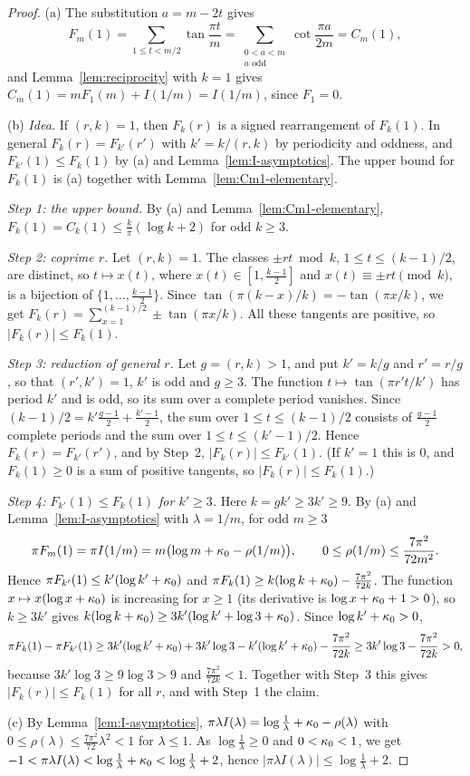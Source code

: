 \begin{proof}
(a) The substitution $a=m-2t$ gives
\[
F_m(1)=\sum_{1\le t<m/2}\tan\frac{\pi t}m=\sum_{\substack{0<a<m\\ a\text{ odd}}}\cot\frac{\pi a}{2m}=C_m(1),
\]
and Lemma~\ref{lem:reciprocity} with $k=1$ gives $C_m(1)=mF_1(m)+I(1/m)=I(1/m)$, since $F_1=0$.

(b) \emph{Idea.} If $(r,k)=1$, then $F_k(r)$ is a signed rearrangement of $F_k(1)$. In general $F_k(r)=F_{k'}(r')$ with $k'=k/(r,k)$ by periodicity and oddness, and $F_{k'}(1)\le F_k(1)$ by (a) and Lemma~\ref{lem:I-asymptotics}. The upper bound for $F_k(1)$ is (a) together with Lemma~\ref{lem:Cm1-elementary}.

\emph{Step 1: the upper bound.} By (a) and Lemma~\ref{lem:Cm1-elementary}, $F_k(1)=C_k(1)\le\frac k\pi(\log k+2)$ for odd $k\ge3$.

\emph{Step 2: coprime $r$.} Let $(r,k)=1$. The classes $\pm rt\bmod k$, $1\le t\le(k-1)/2$, are distinct, so $t\mapsto x(t)$, where $x(t)\in[1,\frac{k-1}2]$ and $x(t)\equiv\pm rt\pmod k$, is a bijection of $\{1,\dots,\frac{k-1}2\}$. Since $\tan(\pi(k-x)/k)=-\tan(\pi x/k)$, we get $F_k(r)=\sum_{x=1}^{(k-1)/2}\pm\tan(\pi x/k)$. All these tangents are positive, so $|F_k(r)|\le F_k(1)$.

\emph{Step 3: reduction of general $r$.} Let $g=(r,k)>1$, and put $k'=k/g$ and $r'=r/g$, so that $(r',k')=1$, $k'$ is odd and $g\ge3$. The function $t\mapsto\tan(\pi r't/k')$ has period $k'$ and is odd, so its sum over a complete period vanishes. Since $(k-1)/2=k'\frac{g-1}2+\frac{k'-1}2$, the sum over $1\le t\le(k-1)/2$ consists of $\frac{g-1}2$ complete periods and the sum over $1\le t\le(k'-1)/2$. Hence $F_k(r)=F_{k'}(r')$, and by Step~2, $|F_k(r)|\le F_{k'}(1)$. (If $k'=1$ this is $0$, and $F_k(1)\ge0$ is a sum of positive tangents, so $|F_k(r)|\le F_k(1)$.)

\emph{Step 4: $F_{k'}(1)\le F_k(1)$ for $k'\ge3$.} Here $k=gk'\ge3k'\ge9$. By (a) and Lemma~\ref{lem:I-asymptotics} with $\lambda=1/m$, for odd $m\ge3$
\[
\pi F_m(1)=\pi I(1/m)=m\bigl(\log m+\kappa_0-\rho(1/m)\bigr),\qquad 0\le\rho(1/m)\le\frac{7\pi^2}{72m^2}.
\]
Hence $\pi F_{k'}(1)\le k'(\log k'+\kappa_0)$ and $\pi F_k(1)\ge k(\log k+\kappa_0)-\frac{7\pi^2}{72k}$. The function $x\mapsto x(\log x+\kappa_0)$ is increasing for $x\ge1$ (its derivative is $\log x+\kappa_0+1>0$), so $k\ge3k'$ gives $k(\log k+\kappa_0)\ge3k'(\log k'+\log3+\kappa_0)$. Since $\log k'+\kappa_0>0$,
\[
\pi F_k(1)-\pi F_{k'}(1)\ge3k'(\log k'+\kappa_0)+3k'\log3-k'(\log k'+\kappa_0)-\frac{7\pi^2}{72k}\ge3k'\log3-\frac{7\pi^2}{72k}>0,
\]
because $3k'\log 3\ge9\log3>9$ and $\frac{7\pi^2}{72k}<1$. Together with Step~3 this gives $|F_k(r)|\le F_k(1)$ for all $r$, and with Step~1 the claim.

(c) By Lemma~\ref{lem:I-asymptotics}, $\pi\lambda I(\lambda)=\log\frac1\lambda+\kappa_0-\rho(\lambda)$ with $0\le\rho(\lambda)\le\frac{7\pi^2}{72}\lambda^2<1$ for $\lambda\le1$. As $\log\frac1\lambda\ge0$ and $0<\kappa_0<1$, we get $-1<\pi\lambda I(\lambda)<\log\frac1\lambda+\kappa_0<\log\frac1\lambda+2$, hence $|\pi\lambda I(\lambda)|\le\log\frac1\lambda+2$.
\end{proof}
